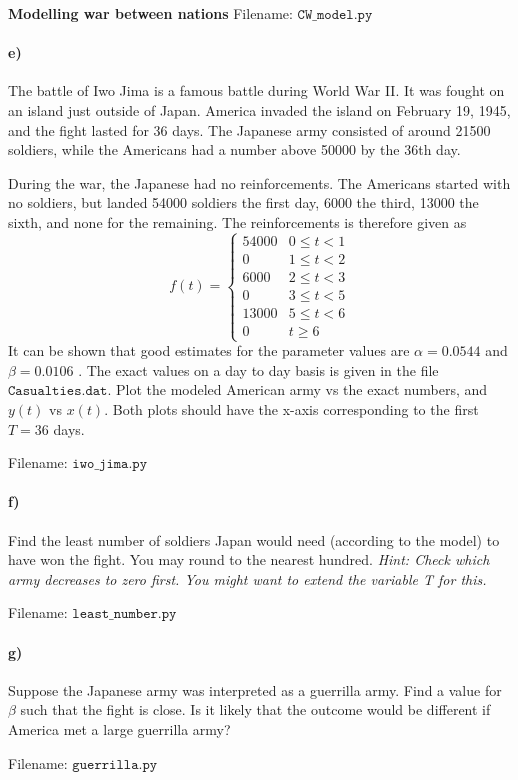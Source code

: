 \begin{Problem}{\textbf{Modelling war between nations}}
Filename: $\texttt{CW\_model.py}$

\paragraph{e)}
The battle of Iwo Jima is a famous battle during World War II. It was fought on
an island just outside of Japan. America invaded the island on February 19, 1945,
and the fight lasted for 36 days. The Japanese army consisted of around 21500
soldiers, while the Americans had a number above 50000 by the 36th day.

During the war, the Japanese had no reinforcements. The Americans started with no
soldiers, but landed 54000 soldiers the first day, 6000 the third, 13000 the sixth, and none
for the remaining. The reinforcements is therefore given as
\begin{equation*}
    f(t)=\begin{cases}
        54000 & 0\leq t<1 \\
        0 & 1 \leq t < 2 \\
        6000 & 2 \leq t < 3 \\
        0 & 3 \leq t < 5 \\
        13000 & 5 \leq t < 6 \\
        0 & t \geq 6
    \end{cases}
\end{equation*}
It can be shown that good estimates for the parameter values are $\alpha=0.0544$
and $\beta = 0.0106$ \cite{braun}. The exact values on a day to day basis is
given in the file $\texttt{Casualties.dat}$. Plot
the modeled American army vs the exact numbers, and $y(t)$ vs $x(t)$.
Both plots should have the x-axis corresponding to the first $T = 36$ days.

Filename: $\texttt{iwo\_jima.py}$

\paragraph{f)}
Find the least number of soldiers Japan would need (according to the model)
to have won the fight. You may round to the nearest hundred.
\emph{Hint: Check which army decreases to zero first. You might want to extend the
variable T for this.}

Filename: $\texttt{least\_number.py}$

\paragraph{g)}
Suppose the Japanese army was interpreted as a guerrilla army. Find a value for $\beta$
such that the fight is close. Is it likely that the outcome would be different if
America met a large guerrilla army?

Filename: $\texttt{guerrilla.py}$
\end{Problem}

